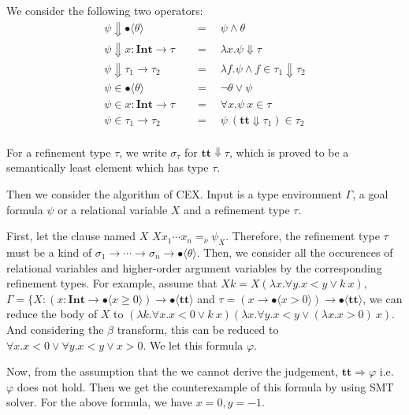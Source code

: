 \documentclass[runningheads]{llncs}
\newcommand \true {\textbf{tt}}
\newcommand \stypeint {\textbf{Int}}
\newcommand \stypebool {\bullet}
\newcommand \constraint {\theta}
\newcommand \typeint[1]{{#1} : \stypeint}
\newcommand \typebool[1]{\stypebool \langle #1 \rangle}
\begin{document}
We consider the following two operators:
\begin{align*}
    \psi \Downarrow \typebool{\constraint} \quad
        &= \quad \psi \land \constraint
        \\
    \psi \Downarrow \typeint{x} \to \tau   \quad
        &= \quad \lambda x. \psi \Downarrow \tau
        \\
    \psi \Downarrow \tau_1 \to \tau_2 \quad
        &= \quad \lambda f. \psi \land f \in \tau_1 \Downarrow \tau_2
        \\
    \psi \in \typebool{\constraint} \quad
        &= \quad \lnot \theta \lor \psi
        \\
    \psi \in \typeint{x} \to \tau   \quad
        &= \quad \forall x. \psi\ x \in \tau
        \\
    \psi \in \tau_1 \to \tau_2 \quad
        &= \quad \psi\ (\true \Downarrow \tau_1) \in \tau_2
        \\
\end{align*}

For a refinement type \( \tau \),
we write \( \sigma_\tau \) for \( \true \Downarrow \tau \),
which is proved to be a semantically least element which has
type \( \tau \).

Then we consider the algorithm of CEX.
Input is a type environment \( \Gamma \), a goal formula \( \psi \)
or a relational variable \( X \) and a refinement type \( \tau \).

First, let the clause named \( X \) \( X x_1 \cdots x_n =_\nu \psi_X \).
Therefore, the refinement type \( \tau \) must be a kind of
\( \sigma_1 \rightarrow \cdots \rightarrow \sigma_n \rightarrow
\typebool{\theta} \).
Then, we consider all the occurences of relational variables and higher-order
argument variables by the corresponding refinement types.
For example, assume that \(X k = X (\lambda x. \forall y. x < y \lor k\ x) \),
\( \Gamma = \{ X: (\typeint{x} \rightarrow \typebool{x \geq 0}) \rightarrow
\typebool{\true} \)
and \( \tau = (x \to \typebool{x > 0}) \to \typebool{\true}\),
we can reduce the body of \( X \) to
\( (\lambda k. \forall x. x < 0 \lor k\ x)
(\lambda x. \forall y. x < y \lor (\lambda x. x > 0)\ x)
\). And considering the \( \beta \) transform, this can be reduced to
\( \forall x. x < 0 \lor \forall y. x < y \lor x > 0\). We let this formula \(
\varphi \).

Now, from the assumption that the we cannot derive the judgement,
\( \true \Rightarrow \varphi \) i.e. \( \varphi \) does not hold.
Then we get the counterexample of this formula by using SMT solver.
For the above formula, we have \( x = 0, y = -1 \).
\end{document}
